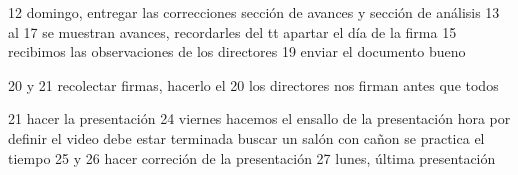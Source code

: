 

	12 domingo, entregar las correcciones sección de avances y sección de análisis
	13 al 17 se muestran avances, recordarles del tt
		apartar el día de la firma
	15 recibimos las observaciones de los directores
	19 enviar el documento bueno

	20 y 21 recolectar firmas, hacerlo el 20
		los directores nos firman antes que todos

	21 hacer la presentación
	24 viernes hacemos el ensallo de la presentación
		hora por definir
		el video debe estar terminada
		buscar un salón con cañon
		se practica el tiempo 
	25 y 26 hacer correción de la presentación 
	27 lunes, última presentación
